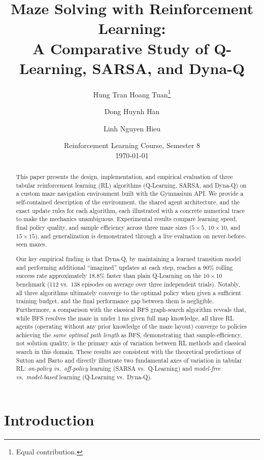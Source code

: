 \documentclass[11pt]{article}
\title{Maze Solving with Reinforcement Learning:\\
A Comparative Study of Q-Learning, SARSA, and Dyna-Q}
\author{%
  Hung Tran Hoang Tuan\thanks{Equal contribution.} \and
  Dong Huynh Han\footnotemark[1] \and
  Linh Nguyen Hieu\footnotemark[1]%
}
\date{Reinforcement Learning Course, Semester 8 \\ \today}
\begin{document}
\maketitle

\begin{abstract}
This paper presents the design, implementation, and empirical evaluation of
three tabular reinforcement learning (RL) algorithms (Q-Learning, SARSA,
and Dyna-Q) on a custom maze navigation environment built with the
Gymnasium API. We provide a self-contained description of the environment,
the shared agent architecture, and the exact update rules for each
algorithm, each illustrated with a concrete numerical trace to make the
mechanics unambiguous. Experimental results compare learning speed, final
policy quality, and sample efficiency across three maze sizes
($5\times5$, $10\times10$, and $15\times15$), and generalization is
demonstrated through a live evaluation on never-before-seen mazes.

Our key empirical finding is that Dyna-Q, by maintaining a learned
transition model and performing additional ``imagined'' updates at each
step, reaches a 90\% rolling success rate approximately 18.8\% faster than
plain Q-Learning on the $10\times10$ benchmark (112 vs.\ 138 episodes on
average over three independent trials). Notably, all three algorithms
ultimately converge to the optimal policy when given a sufficient training
budget, and the final performance gap between them is negligible.
Furthermore, a comparison with the classical BFS graph-search algorithm
reveals that, while BFS resolves the maze in under 1\,ms given full map
knowledge, all three RL agents (operating without any prior knowledge of
the maze layout) converge to policies achieving the \emph{same optimal
path length} as BFS, demonstrating that sample-efficiency, not solution
quality, is the primary axis of variation between RL methods and
classical search in this domain.
These results are consistent with the theoretical predictions of Sutton and Barto
\cite{sutton2018} and directly illustrate two fundamental axes of variation
in tabular RL: \emph{on-policy vs.\ off-policy} learning (SARSA vs.\
Q-Learning) and \emph{model-free vs.\ model-based} learning (Q-Learning
vs.\ Dyna-Q).
\end{abstract}

\section{Introduction}
\end{document}
